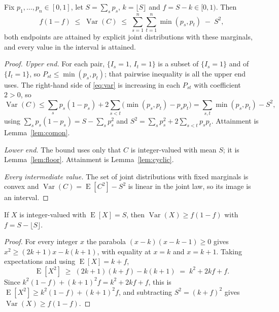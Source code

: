 \begin{proposition}
\label{prop:sharp}
Fix $p_1,\dots,p_n \in [0,1]$, let $S=\sum_s p_s$, $k=\lfloor S \rfloor$ and
$f = S-k \in [0,1)$.  Then
\begin{equation}
  f(1-f) \;\le\; \operatorname{Var}(C) \;\le\;
  \sum_{s=1}^{n}\sum_{t=1}^{n} \min(p_s,p_t) \;-\; S^2 ,
  \label{eq:sharp}
\end{equation}
both endpoints are attained by explicit joint distributions with these
marginals, and every value in the interval is attained.
\end{proposition}

\begin{proof}
\emph{Upper end.}  For each pair, $\{I_s=1,\,I_t=1\}$ is a subset of
$\{I_s=1\}$ and of $\{I_t=1\}$, so $P_{st} \le \min(p_s,p_t)$; that pairwise
inequality is all the upper end uses.  The right-hand side of
\eqref{eq:var} is increasing in each $P_{st}$ with coefficient $2>0$, so
\[
  \operatorname{Var}(C) \le \sum_s p_s(1-p_s)
   + 2\sum_{s<t}\bigl(\min(p_s,p_t) - p_s p_t\bigr)
   = \sum_{s,t}\min(p_s,p_t) - S^2 ,
\]
using $\sum_s p_s(1-p_s) = S - \sum_s p_s^2$ and
$S^2 = \sum_s p_s^2 + 2\sum_{s<t}p_sp_t$.  Attainment is Lemma~\ref{lem:comon}.

\emph{Lower end.}  The bound uses only that $C$ is integer-valued with mean
$S$; it is Lemma~\ref{lem:floor}.  Attainment is Lemma~\ref{lem:cyclic}.

\emph{Every intermediate value.}  The set of joint distributions with fixed
marginals is convex and $\operatorname{Var}(C) = \operatorname{E}[C^2]-S^2$ is
linear in the joint law, so its image is an interval.
\end{proof}

\begin{lemma}
\label{lem:floor}
If $X$ is integer-valued with $\operatorname{E}[X]=S$, then
$\operatorname{Var}(X) \ge f(1-f)$ with $f = S-\lfloor S\rfloor$.
\end{lemma}

\begin{proof}
For every integer $x$ the parabola $(x-k)(x-k-1) \ge 0$ gives
$x^2 \ge (2k+1)x - k(k+1)$, with equality at $x=k$ and $x=k+1$.  Taking
expectations and using $\operatorname{E}[X]=k+f$,
\[
  \operatorname{E}[X^2] \;\ge\; (2k+1)(k+f) - k(k+1)
  \;=\; k^2 + 2kf + f .
\]
Since $k^2(1-f)+(k+1)^2 f = k^2+2kf+f$, this is
$\operatorname{E}[X^2] \ge k^2(1-f)+(k+1)^2f$, and subtracting
$S^2=(k+f)^2$ gives $\operatorname{Var}(X) \ge f(1-f)$.
\end{proof}

